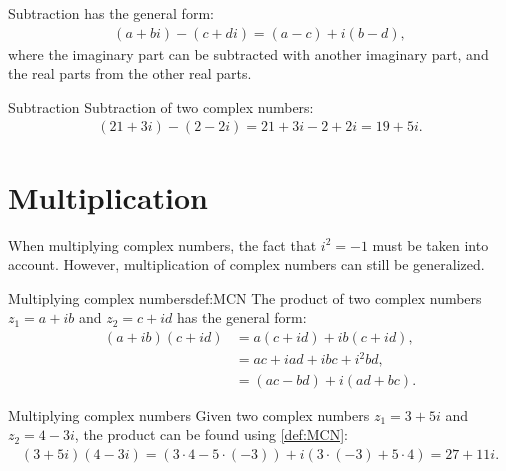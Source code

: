 \noindent 
Subtraction has the general form:
\begin{align*}
(a + bi) - (c + di) = (a - c) + i(b - d),
\end{align*}
where the imaginary part can be subtracted with another imaginary part, and the real parts from the other real parts.

\begin{example}{Subtraction}{}
Subtraction of two complex numbers:
\begin{align*}
(21 + 3i) - (2 - 2i) = 21 + 3i - 2 + 2i = 19 + 5i.
\end{align*}
\end{example}

\section{Multiplication}
When multiplying complex numbers, the fact that $i^2 =-1$ must be taken into account. However, multiplication of complex numbers can still be generalized. 
\begin{definition}{Multiplying complex numbers}{def:MCN}
The product of two complex numbers $z_1=a+ib$ and $z_2=c+id$ has the general form:
\begin{align*}
(a+ib)(c+id)&=a(c+id)+ib(c+id),
\\
&=ac+iad+ibc+i^2bd,
\\
&=(ac-bd)+i(ad+bc).
\end{align*}
\end{definition}
\begin{example}{Multiplying complex numbers}{}
Given two complex numbers $z_1=3+5i$ and $z_2=4-3i$, the product can be found using \cref{def:MCN}:
\begin{align*}
(3+5i)(4-3i) = (3\cdot4-5\cdot(-3))+i(3\cdot(-3)+5\cdot4)=27+11i.
\end{align*}
\end{example}


